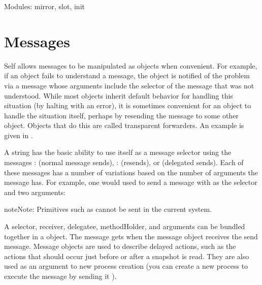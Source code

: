 \documentclass[letterpaper,10pt,english]{sphinxmanual}
\begin{document}
Modules: mirror, slot, init


\section{Messages}
\label{\detokenize{messages:messages}}\label{\detokenize{messages::doc}}
Self allows messages to be manipulated as objects when convenient. For example, if an object
fails to understand a message, the object is notified of the problem via a message whose arguments
include the selector of the message that was not understood. While most objects inherit default
behavior for handling this situation (by halting with an error), it is sometimes convenient for an object
to handle the situation itself, perhaps by resending the message to some other object. Objects
that do this are called transparent forwarders. An example is given in .

A string has the basic ability to use itself as a message selector using the messages : (normal
message sends), : (resends), or  (delegated sends).
Each of these messages has a number of variations based on the number of arguments the message
has. For example, one would used  to send a message with  as the
selector and two arguments:

\begin{sphinxVerbatim}[commandchars=\\\{\}]
      
\end{sphinxVerbatim}

\begin{sphinxadmonition}{note}{Note:}
Primitives such as  cannot be sent in the current system.
\end{sphinxadmonition}

A selector, receiver, delegatee, methodHolder, and arguments can be bundled together in a 
object. The message gets  when the message object receives the send message. Message
objects are used to describe delayed actions, such as the actions that should occur just before or after
a snapshot is read. They are also used as an argument to new process creation (you can create a
new process to execute the message by sending it ).
\end{document}
